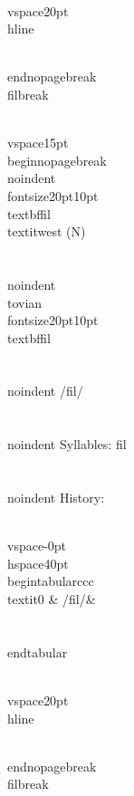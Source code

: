 \\vspace{20pt}\\hline

\\end{nopagebreak}
\\filbreak



\\vspace{15pt}
\\begin{nopagebreak}
\\noindent{\\fontsize{20pt}{10pt}\\textbf{fil} } \\textit{west} (N)\\\\
\\noindent {\\tovian \\fontsize{20pt}{10pt} \\textbf{fil} }\\\\
\\noindent /f{\textprimstress}il/\\\\
\\noindent Syllables: fil\\\\


\\noindent History:

\\vspace{-0pt}
\\hspace{40pt}
\\begin{tabular}{ccc}
\\textit{0} & /fil/& \\\\
\\end{tabular}

\\vspace{20pt}\\hline

\\end{nopagebreak}
\\filbreak



